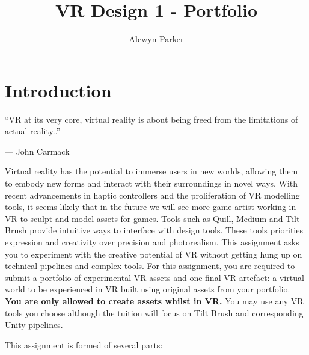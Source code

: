 \documentclass{../../fal_assignment}
\title{VR Design 1 - Portfolio}
\author{Alcwyn Parker}
\begin{document}
\maketitle

\section*{Introduction}

\begin{marginquote}
``VR at its very core, virtual reality is about being freed from the limitations of actual reality..''

--- John Carmack

\end{marginquote}

Virtual reality has the potential to immerse users in new worlds, allowing them to embody new forms and interact with their surroundings in novel ways. With recent advancements in haptic controllers and the proliferation of VR modelling tools, it seems likely that in the future we will see more game artist working in VR to sculpt and model assets for games. Tools such as Quill, Medium and Tilt Brush provide intuitive ways to interface with design tools. These tools priorities expression and creativity over precision and photorealism. This assignment asks you to experiment with the creative potential of VR without getting hung up on technical pipelines and complex tools. For this assignment, you are required to submit a portfolio of experimental VR assets and one final VR artefact: a virtual world to be experienced in VR built using original assets from your portfolio. \textbf{ You are only allowed to create assets whilst in VR.} You may use any VR tools you choose although the tuition will focus on Tilt Brush and corresponding Unity pipelines. 

This assignment is formed of several parts:
\end{document}

